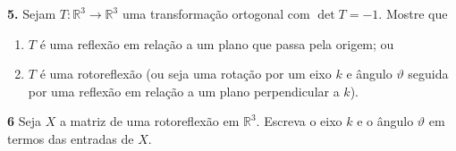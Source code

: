 \documentclass{amsart}
\newcommand{\R}{\mathbb R}
\begin{document}
\medskip

{\bf 5.} Sejam $T:\R^3\to\R^3$ uma transformação ortogonal com $\det T=-1$. Mostre que 
\begin{enumerate}
    \item $T$ é uma reflexão em relação a um plano que passa pela origem; ou 
    \item $T$ é uma rotoreflexão (ou seja uma rotação por um eixo $k$ e ângulo $\vartheta$ 
    seguida por uma reflexão 
    em relação a um plano perpendicular a $k$).
\end{enumerate}

\medskip

{\bf 6} Seja $X$ a matriz de uma rotoreflexão em $\R^3$. Escreva o eixo $k$ e o ângulo $\vartheta$ 
em termos das entradas de $X$.
\end{document}
